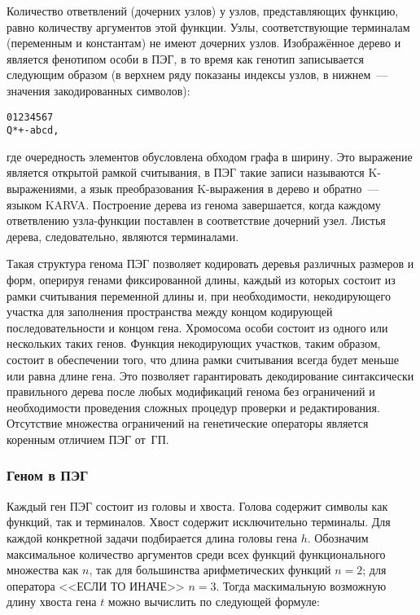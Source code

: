 Количество ответвлений (дочерних узлов) у узлов, представляющих функцию, равно количеству аргументов этой функции. Узлы, соответствующие терминалам (переменным и константам) не имеют дочерних узлов. Изображённое дерево и является фенотипом особи в ПЭГ, в то время как генотип записывается следующим образом (в верхнем ряду показаны индексы узлов, в нижнем~--- значения закодированных символов):

\begin{samepage}
\begin{verbatim}
01234567
Q*+-abcd,
\end{verbatim}
\end{samepage}

где очередность элементов обусловлена обходом графа в ширину. Это выражение является открытой рамкой считывания, в ПЭГ такие записи называются K-выражениями, а язык преобразования K-выражения в дерево и обратно~--- языком KARVA. Построение дерева из генома завершается, когда каждому ответвлению узла-функции поставлен в соответствие дочерний узел. Листья дерева, следовательно, являются терминалами.

Такая структура генома ПЭГ позволяет кодировать деревья различных размеров и форм, оперируя генами фиксированной длины, каждый из которых состоит из рамки считывания переменной длины и, при необходимости, некодирующего участка для заполнения пространства между концом кодирующей последовательности и концом гена. Хромосома особи состоит из одного или нескольких таких генов. Функция некодирующих участков, таким образом, состоит в обеспечении того, что длина рамки считывания всегда будет меньше или равна длине гена. Это позволяет гарантировать декодирование синтаксически правильного дерева после любых модификаций генома без ограничений и необходимости проведения сложных процедур проверки и редактирования. Отсутствие множества ограничений на генетические операторы является коренным отличием ПЭГ от~ГП.


\subsubsection{Геном в ПЭГ}

Каждый ген ПЭГ состоит из головы и хвоста. Голова содержит символы как функций, так и терминалов. Хвост содержит исключительно терминалы. Для каждой конкретной задачи подбирается длина головы гена $h$. Обозначим максимальное количество аргументов среди всех функций функционального множества как $n$, так для большинства арифметических функций $n=2$; для оператора <<ЕСЛИ ТО ИНАЧЕ>> $n=3$. Тогда маскимальную возможную длину хвоста гена $t$ можно вычислить по следующей формуле:

